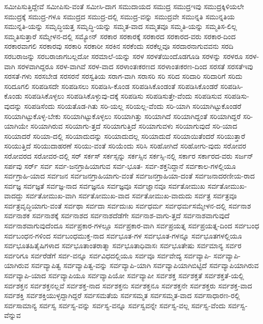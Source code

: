 {ಸಮೀಪಿಸುತ್ತಿದ್ದೇವೆ
ಸಮೀಪಿಸು-ವಂತೆ
ಸಮೀಸಿ-ದಾಗ
ಸಮುದಾಯದ
ಸಮುದ್ರ
ಸಮುದ್ರಇವು
ಸಮುದ್ರಕ್ಕಿಳಿಯಲೇ
ಸಮುದ್ರಕ್ಕೆ
ಸಮುದ್ರ-ಗಳೂ
ಸಮುದ್ರದ
ಸಮುದ್ರ-ದಲ್ಲಿ
ಸಮುದ್ರ-ವನ್ನು
ಸಮುದ್ರವೇ
ಸಮುನ್ನತಿ
ಸಮುನ್ನತಿಯ
ಸಮುನ್ನತಿ-ಯನ್ನು
ಸಮೃದ್ಧಿಯತ್ತ
ಸಮೃದ್ಧಿ-ಯನ್ನು
ಸಮ್ಮತ-ವಾದ
ಸಮ್ಮತವೂ
ಸಮ್ಮತಿ-ಯನ್ನು
ಸಮ್ಮತಿಸ-ಲಿಲ್ಲ
ಸಮ್ಮತಿಸುತ್ತಾರೆ
ಸಮ್ಮೇಳನ-ದಲ್ಲಿ
ಸಮ್ಯೋನ್
ಸರಕಾರ
ಸರಕಾರಕ್ಕೆ
ಸರಕಾರದ
ಸರಕಾರದ-ವರು
ಸರಕಾರ-ದಿಂದ
ಸರಕಾರವಾಗಲಿ
ಸರಕಾರವು
ಸರಕಾರಿ
ಸರಕಾರೀ
ಸರಕಿನ
ಸರಕೆಂದು
ಸರಕೆಲ್ಲವೂ
ಸರದಾರನಾಗುವವನು
ಸರದಿ
ಸರಬರಾಜನ್ನು
ಸರಬರಾಜಾಗಬಲ್ಲದೋ
ಸರಮಾಲೆ-ಯನ್ನು
ಸರಳ
ಸರಳತೆಯಿಂದೊಡಗೂಡಿ
ಸರಳನ್ನು
ಸರಳರೂ
ಸರಳ-ವಾಗಿ
ಸರಳವಾಗಿದ್ದರೂ
ಸರಳ-ವಾಗಿವೆ
ಸರಳ-ವಾದ
ಸರಳಾಂತಃಕರಣದ
ಸರಳಾಂತಃಕರಣ-ದಿಂದ
ಸರಸತೆ
ಸರಸತೆಇವು
ಸರಸತೆ-ಗಳು
ಸರಸಬೇಡ
ಸರಸರನೆ
ಸರಸ್ವತಿಯ
ಸರಾಗ-ವಾಗಿ
ಸರಾಸರಿ
ಸರಿ
ಸರಿದ
ಸರಿದಾರಿ
ಸರಿದಾರಿಗೆ
ಸರಿದು
ಸರಿದೂಗಲಿ
ಸರಿಪಡಿಸದೇ
ಸರಿಪಡಿಸಲು
ಸರಿಪಡಿಸಿ-ಕೊಂಡ
ಸರಿಪಡಿಸಿಕೊಂಡಂತೆ
ಸರಿಪಡಿಸಿಕೊಂಡರೆ
ಸರಿಪಡಿಸಿ-ಕೊಂಡು
ಸರಿಪಡಿಸಿಕೊಳ್ಳಲು
ಸರಿಪಡಿಸಿಕೊಳ್ಳುವು-ದಕ್ಕೆ
ಸರಿಪಡಿಸು
ಸರಿಪಡಿಸುತ್ತೇ-ವೆಂದು
ಸರಿಪಡಿಸುವ
ಸರಿಪಡಿಸು-ವುದನ್ನು
ಸರಿಪಡಿಸೆಂದು
ಸರಿಯತೊಡ-ಗಿತು
ಸರಿ-ಯಲ್ಲ
ಸರಿಯಲ್ಲ-ವೆಂದು
ಸರಿ-ಯಾಗಿ
ಸರಿಯಾಗಿಟ್ಟುಕೊಂಡರೆ
ಸರಿಯಾಗಿಟ್ಟುಕೊಳ್ಳ-ಬೇಕು
ಸರಿಯಾಗಿಟ್ಟುಕೊಳ್ಳಲು
ಸರಿಯಾಗಿತ್ತು
ಸರಿಯಾಗಿದೆ
ಸರಿಯಾಗಿದ್ದಂತೆ
ಸರಿಯಾಗಿದ್ದರೆ
ಸರಿ-ಯಾಗಿಯೇ
ಸರಿಯಾಗಿರುವ
ಸರಿಯಾಗು-ತ್ತದೆ
ಸರಿಯಾಗುತ್ತಿದೆ
ಸರಿಯಾಗುವಳು
ಸರಿಯಾಗುವುದೆ
ಸರಿ-ಯಾದ
ಸರಿಯಾದರೆ
ಸರಿಯಾ-ದಲ್ಲಿ
ಸರಿಯಾದುದನ್ನು
ಸರಿಯಾದುದಲ್ಲ
ಸರಿಯಾದುದೆ
ಸರಿಯಾಯಿತೆಂದರೆ
ಸರಿಯುತ್ತಾರೆ
ಸರಿಯುತ್ತಿದೆ
ಸರಿಯುದಾಹರಣೆ
ಸರಿಯು-ವಂತೆ
ಸರಿಯೆಂದು
ಸರಿಸಿ
ಸರಿಹೋಗಿದೆ
ಸರಿಹೋಗು-ವುದು
ಸರೋವರ
ಸರೋವರದ
ಸರೋವರ-ದಲ್ಲಿ
ಸರ್
ಸರ್ಕಸ್
ಸರ್ಕಸ್ಸನ್ನು
ಸರ್ಕಸ್ಸಿನ
ಸರ್ಕಸ್ಸಿ-ನಲ್ಲಿ
ಸರ್ಕಾರ
ಸರ್ಕಾರದ-ವರು
ಸರ್ಜನ್
ಸರ್ಪವು
ಸರ್ರ್
ಸರ್ವ
ಸರ್ವ-ಜನಗ್ರಾಹಿಯಾಗುವ
ಸರ್ವ-ಭೂತ-
ಸರ್ವ-ಶಕ್ತನಿದ್ದಾನೆ
ಸರ್ವಕಾಲ-ಗಳಲ್ಲಿಯೂ
ಸರ್ವಗ್ರಾಹಿ-ಯಾದ
ಸರ್ವಜನ
ಸರ್ವಜನಗ್ರಾಹಿಯಾಗು-ವಂತೆ
ಸರ್ವಜನಗ್ರಾಹಿಯಾ-ದಂತೆ
ಸರ್ವಜನಾದರಣೀಯ-ರಾದ
ಸರ್ವಜ್ಞ
ಸರ್ವಜ್ಞತೆ
ಸರ್ವಜ್ಞ-ನಾದ
ಸರ್ವಜ್ಞನೂ
ಸರ್ವಜ್ಞವೂ
ಸರ್ವಜ್ಞಾನವೂ
ಸರ್ವತೋಮುಖ
ಸರ್ವತೋಮುಖ-ವಾದದ್ದು
ಸರ್ವತೋಮುಖ-ವಾಗಿ
ಸರ್ವತೋಮುಖ-ವಾದ
ಸರ್ವತೋಮುಖ-ವಾದುದು
ಸರ್ವತ್ರ
ಸರ್ವತ್ರವೂ
ಸರ್ವತ್ರವೃದ್ಧಿಯಾಗು-ವಂತೆ
ಸರ್ವಥಾ
ಸರ್ವದಾ
ಸರ್ವದುಃಖ
ಸರ್ವಧರ್ಮ
ಸರ್ವಧರ್ಮಸಮ್ಮೇಳನ-ದಲ್ಲಿ
ಸರ್ವನಾಶ
ಸರ್ವನಾಶಕ
ಸರ್ವನಾಶಕ್ಕೆ
ಸರ್ವನಾಶದ
ಸರ್ವನಾಶದೆಡೆಗೇ
ಸರ್ವನಾಶ-ವಾಗು-ತ್ತದೆ
ಸರ್ವನಾಶವಾಗುವುದೆ
ಸರ್ವನಾಶವಾಗುವುದೆಂದೂ
ಸರ್ವಪ್ರಕಾರ-ಗಳಲ್ಲೂ
ಸರ್ವಪ್ರಕಾರ-ವಾಗಿ
ಸರ್ವಪ್ರಯತ್ನ
ಸರ್ವಪ್ರಯತ್ನ-ದಿಂದ
ಸರ್ವಬಂಧ
ಸರ್ವಬಂಧನ-ಗಳಿಂದ
ಸರ್ವಬಂಧಮುಕ್ತ-ನಾದ
ಸರ್ವಭೂತ-ಗಳ
ಸರ್ವಭೂತ-ಗಳನ್ನೂ
ಸರ್ವಭೂತಗಳಲ್ಲಿಯೂ
ಸರ್ವಭೂತಹಿತೈಷಿಗಳಾದ
ಸರ್ವಭೂತಾಂತರಾತ್ಮಾ
ಸರ್ವಭೂತಾಧಿವಾಸಃ
ಸರ್ವಭೂತೇಷು
ಸರ್ವಮಾನ್ಯ
ಸರ್ವರ
ಸರ್ವರಿಗೂ
ಸರ್ವರೆಡೆಗೆ
ಸರ್ವ-ವನ್ನೂ
ಸರ್ವವಿಧದಲ್ಲಿಯೂ
ಸರ್ವವೂ
ಸರ್ವವೇದ್ಯ
ಸರ್ವವ್ಯಾಪಿ-
ಸರ್ವವ್ಯಾಪಿ-ಯಾಗಿರುವ
ಸರ್ವವ್ಯಾಪಿತ್ವ
ಸರ್ವವ್ಯಾಪಿತ್ವ-ವನ್ನು
ಸರ್ವವ್ಯಾಪಿ-ಯಾಗಿ
ಸರ್ವವ್ಯಾಪಿಯಾಗಿಬಿಟ್ಟಿದೆ
ಸರ್ವವ್ಯಾಪಿಯಾಗಿರುವ
ಸರ್ವವ್ಯಾಪಿ-ಯಾದ
ಸರ್ವವ್ಯಾಪಿಯೂ
ಸರ್ವವ್ಯಾಪಿಯೋ
ಸರ್ವವ್ಯಾಪೀ
ಸರ್ವಶಕ್ತ
ಸರ್ವಶಕ್ತತೆ
ಸರ್ವಶಕ್ತತೆ-ಯಲ್ಲಿ
ಸರ್ವಶಕ್ತನ
ಸರ್ವಶಕ್ತನಲ್ಲವೆ
ಸರ್ವಶಕ್ತ-ನಾದ
ಸರ್ವಶಕ್ತನು
ಸರ್ವಶಕ್ತನೂ
ಸರ್ವಶಕ್ತನೇ
ಸರ್ವಶಕ್ತರು
ಸರ್ವಶಕ್ತ-ವಾದ
ಸರ್ವಶಕ್ತಿ
ಸರ್ವಶಕ್ತಿಯುಳ್ಳದ್ದಾಗಿದ್ದರೆ
ಸರ್ವಸಮತೆಯ
ಸರ್ವಸಮ್ಮತ
ಸರ್ವಸಮ್ಮತ-ವಾದ
ಸರ್ವಸಾಧಾರಣ-ರಲ್ಲಿ
ಸರ್ವಸಾಮಾನ್ಯ
ಸರ್ವಸ್ವ
ಸರ್ವಸ್ವ-ವನ್ನು
ಸರ್ವಸ್ವ-ವನ್ನೂ
ಸರ್ವಸ್ವವನ್ನೇ
ಸರ್ವಸ್ವ-ವಲ್ಲ
ಸರ್ವಸ್ವ-ವೆಂದು
ಸರ್ವಸ್ವ-ವೆನ್ನುವ
}
